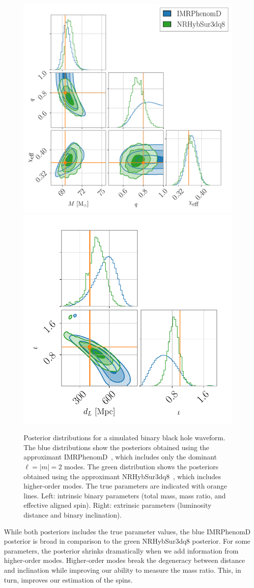 \documentclass[prd,superscriptaddress,twocolumn,nopreprintnumbers,floatfix,longbibliography]{revtex4}
\newcommand{\sur}{{\sc NRHybSur3dq8}\xspace}
\begin{document}
\begin{figure}[t!]
    \centering
    \includegraphics[width=0.56\linewidth]{qlow_full_marg_intrinsic.pdf}
    \includegraphics[width=0.405\linewidth]{qlow_full_marg_extrinsic.pdf}
    \caption{
    Posterior distributions for a simulated binary black hole waveform.
    The blue distributions show the posteriors obtained using the approximant {\sc IMRPhenomD}~\cite{IMRPhenomD}, which includes only the dominant $\ell=|m|=2$ modes.
    The green distribution shows the posteriors obtained using the approximant \sur~\cite{NRHybSur3dq8}, which includes higher-order modes.
    The true parameters are indicated with orange lines.
    Left: intrinsic binary parameters (total mass, mass ratio, and effective aligned spin). Right: extrinsic parameters (luminosity distance and binary inclination).
    }
    \label{fig:comparison_corner_plot}
\end{figure}

While both posteriors includes the true parameter values, the blue {\sc IMRPhenomD} posterior is broad in comparison to the green \sur posterior.
For some parameters, the posterior shrinks dramatically when we add information from higher-order modes.
Higher-order modes break the degeneracy between distance and inclination while improving our ability to measure the mass ratio.
This, in turn, improves our estimation of the spins.
\end{document}
